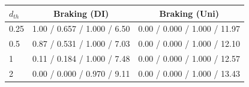 \begin{tabular}{lcc}
\hline
$d_{th}$ & Braking (DI) & Braking (Uni) \\
\hline
0.25 & 1.00 / 0.657 / 1.000 / 6.50 & 0.00 / 0.000 / 1.000 / 11.97 \\
0.5 & 0.87 / 0.531 / 1.000 / 7.03 & 0.00 / 0.000 / 1.000 / 12.10 \\
1 & 0.11 / 0.184 / 1.000 / 7.48 & 0.00 / 0.000 / 1.000 / 12.57 \\
2 & 0.00 / 0.000 / 0.970 / 9.11 & 0.00 / 0.000 / 1.000 / 13.43 \\
\hline
\end{tabular}
